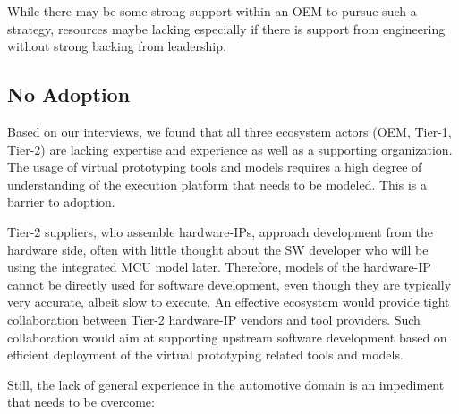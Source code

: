While there may be some strong support within an OEM to pursue such a strategy, resources maybe lacking especially if there is support from engineering without strong backing from leadership.


\subsection{No Adoption}
Based on our interviews, we found that all three ecosystem actors (OEM, Tier-1, Tier-2) are lacking expertise and experience as well as a supporting organization.
The usage of virtual prototyping tools and models requires a high degree of understanding of the execution platform that needs to be modeled. This is a barrier to adoption.

Tier-2 suppliers, who assemble hardware-IPs, approach development from the hardware side, often with little thought about the SW developer who will be using the integrated MCU model later.
Therefore, models of the hardware-IP cannot be directly used for software development, even though they are typically very accurate, albeit slow to execute.
An effective ecosystem would provide tight collaboration between Tier-2 hardware-IP vendors and tool providers. Such collaboration would aim at supporting upstream software development based on efficient deployment of the virtual prototyping related tools and models.

Still, the lack of general experience in the automotive domain is an impediment that needs to be overcome:


